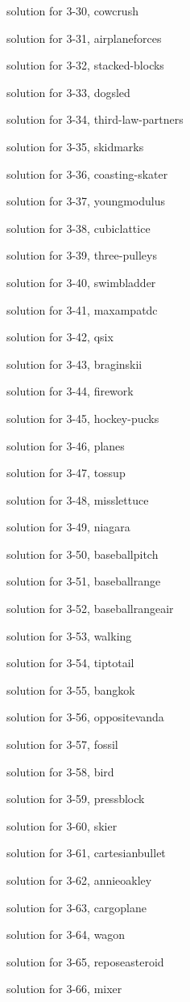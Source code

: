 \documentclass{problems}
\begin{document}
solution for 3-30, cowcrush

solution for 3-31, airplaneforces

solution for 3-32, stacked-blocks

solution for 3-33, dogsled

solution for 3-34, third-law-partners

solution for 3-35, skidmarks

solution for 3-36, coasting-skater

solution for 3-37, youngmodulus

solution for 3-38, cubiclattice

solution for 3-39, three-pulleys

solution for 3-40, swimbladder

solution for 3-41, maxampatdc

solution for 3-42, qsix

solution for 3-43, braginskii

solution for 3-44, firework

solution for 3-45, hockey-pucks

solution for 3-46, planes

solution for 3-47, tossup

solution for 3-48, misslettuce

solution for 3-49, niagara

solution for 3-50, baseballpitch

solution for 3-51, baseballrange

solution for 3-52, baseballrangeair

solution for 3-53, walking

solution for 3-54, tiptotail

solution for 3-55, bangkok

solution for 3-56, oppositevanda

solution for 3-57, fossil

solution for 3-58, bird

solution for 3-59, pressblock

solution for 3-60, skier

solution for 3-61, cartesianbullet

solution for 3-62, annieoakley

solution for 3-63, cargoplane

solution for 3-64, wagon

solution for 3-65, reposeasteroid

solution for 3-66, mixer
\end{document}
